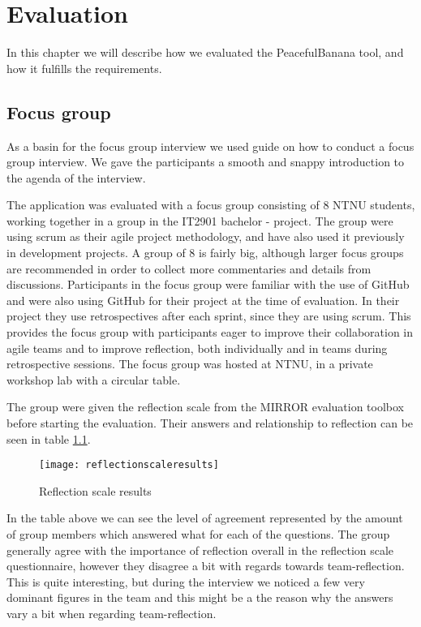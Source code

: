 \chapter{Evaluation}
In this chapter we will describe how we evaluated the PeacefulBanana tool, and how it fulfills the requirements.




\section{Focus group}
As a basin for the focus group interview we used \citet{FocusGrpGuide} guide on how to conduct a focus group interview. We gave the participants a smooth and snappy introduction to the agenda of the interview.

The application was evaluated with a focus group consisting of 8 NTNU students, working together in a group in the IT2901 bachelor - project. The group were using scrum as their agile project methodology, and have also used it previously in development projects. A group of 8 is fairly big, although larger focus groups are recommended in order to collect more commentaries and details from discussions\citep{morgan1998planning}. Participants in the focus group were familiar with the use of GitHub and were also using GitHub for their project at the time of evaluation. In their project they use retrospectives after each sprint, since they are using scrum. This provides the focus group with participants eager to improve their collaboration in agile teams and to improve reflection, both individually and in teams during retrospective sessions. The focus group was hosted at NTNU, in a private workshop lab with a circular table.  

The group were given the reflection scale from the MIRROR evaluation toolbox before starting the evaluation. Their answers and relationship to reflection can be seen in table \ref{reflectionscaleresults}. 
\begin{figure}[H]
\centering
	\texttt{[image: reflectionscaleresults]}
\caption{Reflection scale results}
\label{reflectionscaleresults}
\end{figure}
In the table above we can see the level of agreement represented by the amount of group members which answered what for each of the questions. The group generally agree with the importance of reflection overall in the reflection scale questionnaire, however they disagree a bit with regards towards team-reflection. This is quite interesting, but during the interview we noticed a few very dominant figures in the team and this might be a the reason why the answers vary a bit when regarding team-reflection.

